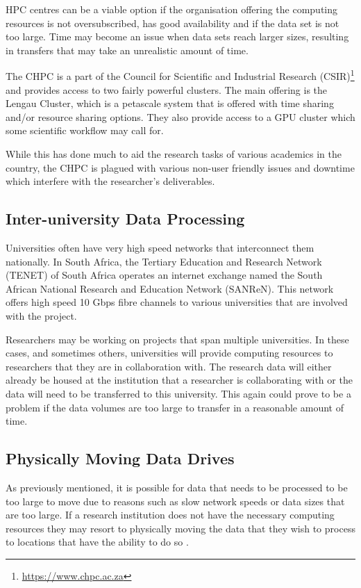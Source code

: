 HPC centres can be a viable option if the organisation offering the computing resources is not oversubscribed, has good availability and if the data set is not too large. Time may become an issue when data sets reach larger sizes, resulting in transfers that may take an unrealistic amount of time.

The CHPC is a part of the Council for Scientific and Industrial Research (CSIR)\footnote{\url{https://www.chpc.ac.za}} and provides access to two fairly powerful clusters. The main offering is the Lengau Cluster, which is a petascale system that is offered with time sharing and/or resource sharing options. They also provide access to a GPU cluster which some scientific workflow may call for.

While this has done much to aid the research tasks of various academics in the country, the CHPC is plagued with various non-user friendly issues and downtime which interfere with the researcher's deliverables.

\subsection{Inter-university Data Processing}

Universities often have very high speed networks that interconnect them nationally. In South Africa, the Tertiary Education and Research Network (TENET) of South Africa operates an internet exchange named the South African National Research and Education Network (SANReN). This network offers high speed 10 Gbps fibre channels to various universities that are involved with the project.

Researchers may be working on projects that span multiple universities. In these cases, and sometimes others, universities will provide computing resources to researchers that they are in collaboration with. The research data will either already be housed at the institution that a researcher is collaborating with or the data will need to be transferred to this university. This again could prove to be a problem if the data volumes are too large to transfer in a reasonable amount of time.

\subsection{Physically Moving Data Drives}

As previously mentioned, it is possible for data that needs to be processed to be too large to move due to reasons such as slow network speeds or data sizes that are too large. If a research institution does not have the necessary computing resources they may resort to physically moving the data that they wish to process to locations that have the ability to do so \parencite{marx2013biology}.

